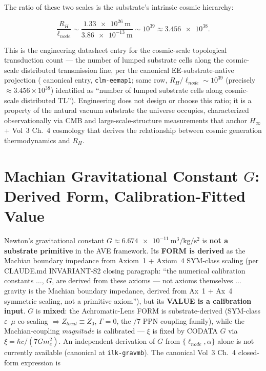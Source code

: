 The ratio of these two scales is the substrate's intrinsic cosmic hierarchy:

\[
\frac{R_H}{\ell_{node}} \sim \frac{\qty{1.33e26}{\metre}}{\qty{3.86e-13}{\metre}} \sim 10^{39} \approx \num{3.456e38}.
\]

This is the engineering datasheet entry for the cosmic-scale topological transduction count --- the number of lumped substrate cells along the cosmic-scale distributed transmission line, per the canonical EE-substrate-native projection ( canonical entry, \texttt{clm-eemap1}; same row, $R_H/\ell_{node} \sim 10^{39}$ (precisely $\approx 3.456\times10^{38}$) identified as ``number of lumped substrate cells along cosmic-scale distributed TL''). Engineering does not design or choose this ratio; it is a property of the natural vacuum substrate the universe occupies, characterized observationally via CMB and large-scale-structure measurements that anchor $H_\infty$ + Vol~3 Ch.~4 cosmology that derives the relationship between cosmic generation thermodynamics and $R_H$.



\section{Machian Gravitational Constant $G$: Derived Form, Calibration-Fitted Value}
\label{sec:vol9_cosmo_machian_g}

Newton's gravitational constant $G \approx \qty{6.674e-11}{\cubic\metre\per\kilogram\per\square\second}$ is \textbf{not a substrate primitive} in the AVE framework. Its \textbf{FORM is derived} as the Machian boundary impedance from Axiom~1 + Axiom~4 SYM-class scaling (per CLAUDE.md INVARIANT-S2 closing paragraph: ``the numerical calibration constants $\ldots$, $G$, are derived from these axioms --- not axioms themselves $\ldots$ gravity is the Machian boundary impedance, derived from Ax~1 + Ax~4 symmetric scaling, not a primitive axiom''), but its \textbf{VALUE is a calibration input}. $G$ is \textbf{mixed}: the Achromatic-Lens FORM is substrate-derived (SYM-class $\varepsilon$--$\mu$ co-scaling $\Rightarrow Z_{local} \equiv Z_0$, $\Gamma = 0$, the $/7$ PPN coupling family), while the Machian-coupling \emph{magnitude} is calibrated --- $\xi$ is fixed by CODATA $G$ via $\xi = \hbar c / (7 G m_e^2)$. An independent derivation of $G$ from $\{\ell_{node}, \alpha\}$ alone is not currently available (canonical at  \texttt{ilk-gravmb}). The canonical Vol~3 Ch.~4 closed-form expression is

